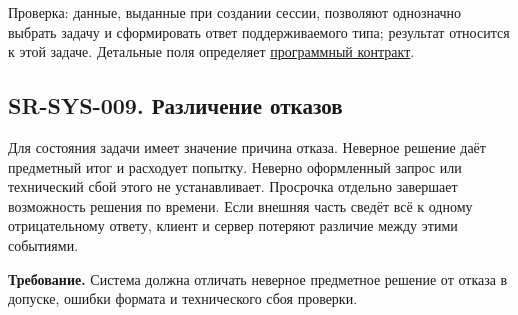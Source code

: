 \documentclass[12pt,a4paper]{article}
\begin{document}
Проверка: данные, выданные при создании сессии, позволяют однозначно выбрать задачу и сформировать ответ поддерживаемого типа; результат относится к этой задаче. Детальные поля определяет \href{../07_\%D0\%9F\%D1\%80\%D0\%BE\%D0\%B3\%D1\%80\%D0\%B0\%D0\%BC\%D0\%BC\%D0\%BD\%D1\%8B\%D0\%B5_\%D1\%82\%D1\%80\%D0\%B5\%D0\%B1\%D0\%BE\%D0\%B2\%D0\%B0\%D0\%BD\%D0\%B8\%D1\%8F/DOC-06.2_\%D0\%A1\%D0\%B5\%D1\%81\%D1\%81\%D0\%B8\%D0\%B8_\%D0\%B7\%D0\%B0\%D0\%B4\%D0\%B0\%D1\%87_\%D0\%B8_\%D0\%BF\%D0\%BB\%D0\%B0\%D0\%BD\%D0\%B8\%D1\%80\%D0\%BE\%D0\%B2\%D1\%89\%D0\%B8\%D0\%BA.pdf\#nameddest=doc-062-\%D0\%BA\%D0\%BE\%D0\%BD\%D1\%82\%D1\%80\%D0\%B0\%D0\%BA\%D1\%82\%D1\%8B-\%D1\%81\%D0\%B5\%D1\%81\%D1\%81\%D0\%B8\%D0\%B9-\%D0\%B7\%D0\%B0\%D0\%B4\%D0\%B0\%D1\%87}{программный контракт}.

\subsection{SR-SYS-009. Различение отказов}\label{sr-sys-009-ux440ux430ux437ux43bux438ux447ux435ux43dux438ux435-ux43eux442ux43aux430ux437ux43eux432}

\hypertarget{sr-sys-009-различение-отказов}{}

Для состояния задачи имеет значение причина отказа. Неверное решение даёт предметный итог и расходует попытку. Неверно оформленный запрос или технический сбой этого не устанавливает. Просрочка отдельно завершает возможность решения по времени. Если внешняя часть сведёт всё к одному отрицательному ответу, клиент и сервер потеряют различие между этими событиями.

\textbf{Требование.} Система должна отличать неверное предметное решение от отказа в допуске, ошибки формата и технического сбоя проверки.
\end{document}
